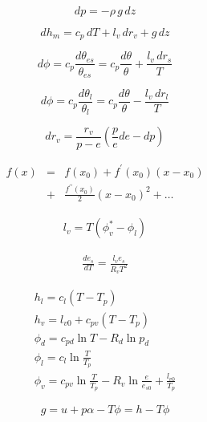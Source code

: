 \documentclass[12pt]{article}
\begin{document}
\begin{multicols}{2}
\begin{equation}
dp = - \rho\,g\,dz
\label{eq:hydro}
\end{equation}


\begin{equation}
\label{eq:moist}
  dh_m = c_p\,dT + l_v\,dr_v + g\,dz
\end{equation}

\begin{equation}
\label{eq:thetaes}
  d\phi = c_p \frac{d\theta_{es}}{\theta_{es}} = c_p \frac{d\theta}{\theta} + \frac{l_v\,dr_s}{T}
\end{equation}

\begin{equation}
  d\phi = c_p \frac{d\theta_l}{\theta_l} = c_p \frac{d\theta}{\theta} - \frac{l_v\,dr_l}{T}
\end{equation}


\begin{equation}
  \label{eq:wdiff}
  d r_v = \frac{r_v}{p-e} \left ( \frac{p}{e} de - dp \right )
\end{equation}

\begin{eqnarray}
  \label{eq:taylor}
  f(x)  &=& f(x_0) + f^\prime(x_0)(x - x_0) \nonumber\\ 
        &+&  \frac{f^{\prime\prime}(x_0)}{2}(x-x_0)^2 +  \ldots
\end{eqnarray}

\begin{gather}
\label{eq:cc}
  l_v = T (\phi_v^* - \phi_l)
\end{gather}

\begin{gather}
  \frac{de_s }{dT} = \frac{l_v e_s}{R_v T^2} 
\end{gather}


\begin{subequations}
  \begin{eqnarray}
  h_l = c_l (T - T_p) \\
 h_v = l_{v0} + c_{pv} ( T - T_p) \\
\phi_d = c_{pd} \ln T - R_d \ln p_d \label{eq:dryentrop}\\
 \phi_l = c_l \ln \frac{T }{T_p}  \\
\phi_v = c_{pv} \ln \frac{T }{T_p} - R_v \ln \frac{e }{e_{s0}} + \frac{l_{v0} }{T_p}  
\label{eq:sdef}
  \end{eqnarray}
\end{subequations}


  \begin{equation}
  g = u + p\alpha - T\phi = h - T\phi
\label{eq:gdef}
  \end{equation}


\end{multicols}
\end{document}
